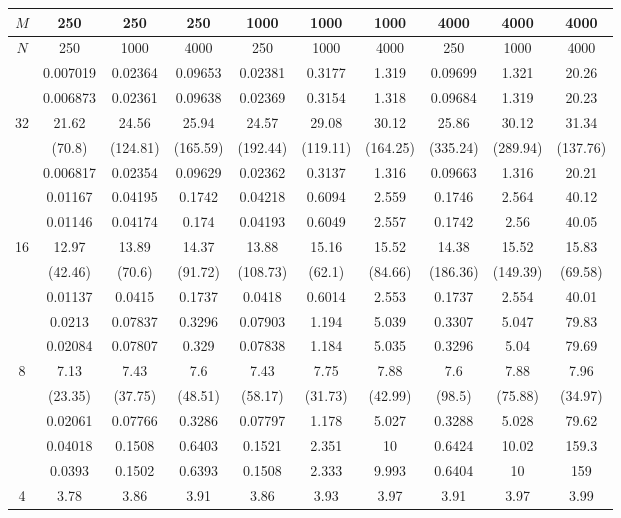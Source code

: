 \begin{table}[ht]
\centering
\begin{tabular}{c|c|c|c|c|c|c|c|c|c|}
\hline
$M$ & 250 & 250 & 250 & 1000 & 1000 & 1000 & 4000 & 4000 & 4000 \\
\hline
$N$ & 250 & 1000 & 4000 & 250 & 1000 & 4000 & 250 & 1000 & 4000 \\
\hline
 & 0.007019 & 0.02364 & 0.09653 & 0.02381 & 0.3177 & 1.319 & 0.09699 & 1.321 & 20.26 \\
 & 0.006873 & 0.02361 & 0.09638 & 0.02369 & 0.3154 & 1.318 & 0.09684 & 1.319 & 20.23 \\
32 & 21.62 & 24.56 & 25.94 & 24.57 & 29.08 & 30.12 & 25.86 & 30.12 & 31.34 \\
 & (70.8) & (124.81) & (165.59) & (192.44) & (119.11) & (164.25) & (335.24) & (289.94) & (137.76) \\
 & 0.006817 & 0.02354 & 0.09629 & 0.02362 & 0.3137 & 1.316 & 0.09663 & 1.316 & 20.21 \\
\hline
 & 0.01167 & 0.04195 & 0.1742 & 0.04218 & 0.6094 & 2.559 & 0.1746 & 2.564 & 40.12 \\
 & 0.01146 & 0.04174 & 0.174 & 0.04193 & 0.6049 & 2.557 & 0.1742 & 2.56 & 40.05 \\
16 & 12.97 & 13.89 & 14.37 & 13.88 & 15.16 & 15.52 & 14.38 & 15.52 & 15.83 \\
 & (42.46) & (70.6) & (91.72) & (108.73) & (62.1) & (84.66) & (186.36) & (149.39) & (69.58) \\
 & 0.01137 & 0.0415 & 0.1737 & 0.0418 & 0.6014 & 2.553 & 0.1737 & 2.554 & 40.01 \\
\hline
 & 0.0213 & 0.07837 & 0.3296 & 0.07903 & 1.194 & 5.039 & 0.3307 & 5.047 & 79.83 \\
 & 0.02084 & 0.07807 & 0.329 & 0.07838 & 1.184 & 5.035 & 0.3296 & 5.04 & 79.69 \\
8 & 7.13 & 7.43 & 7.6 & 7.43 & 7.75 & 7.88 & 7.6 & 7.88 & 7.96 \\
 & (23.35) & (37.75) & (48.51) & (58.17) & (31.73) & (42.99) & (98.5) & (75.88) & (34.97) \\
 & 0.02061 & 0.07766 & 0.3286 & 0.07797 & 1.178 & 5.027 & 0.3288 & 5.028 & 79.62 \\
\hline
 & 0.04018 & 0.1508 & 0.6403 & 0.1521 & 2.351 & 10 & 0.6424 & 10.02 & 159.3 \\
 & 0.0393 & 0.1502 & 0.6393 & 0.1508 & 2.333 & 9.993 & 0.6404 & 10 & 159 \\
4 & 3.78 & 3.86 & 3.91 & 3.86 & 3.93 & 3.97 & 3.91 & 3.97 & 3.99 \\

\end{tabular}
\end{table}
